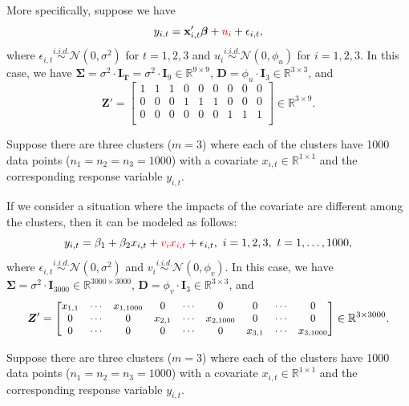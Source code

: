 \documentclass[ignorenonframetext,]{beamer}
\begin{document}
\begin{frame}[allowframebreaks]
\framebreak


More specifically, suppose we have
$$
y_{i,t} = \mathbf{x}_{i,t}'\bm{\beta} + {\color{red}u_i}+ \epsilon_{i,t},
$$
where $\epsilon_{i,t} \overset{i.i.d.}\sim \mathcal{N}(0, \sigma^2)$  for $t=1,2, 3$ and $u_i \overset{i.i.d.}\sim \mathcal{N}(0, \phi_u)$ for $i=1,2, 3$. In this case, we have $\bm{\Sigma} = \sigma^2 \cdot \bm{I}_{\bm{T}} = \sigma^2 \cdot \bm{I}_{9} \in \mathbb{R}^{9 \times 9}$, $\bm{D}= \phi_u \cdot \bm{I}_{{3}}\in \mathbb{R}^{{3} \times {3}}$, and
$$
\bm{Z}'=\begin{bmatrix}
1 & 1 & 1 & 0 & 0 & 0 & 0 & 0 & 0 \\
0 & 0 & 0 & 1 & 1 & 1 & 0 & 0 & 0 \\
0 & 0 & 0 & 0 & 0 & 0 & 1 & 1 & 1 \\
\end{bmatrix}\in \mathbb{R}^{3 \times 9}.
$$

\framebreak

\small
\begin{exam}
Suppose there are three clusters ($m=3$) where each of the clusters have 1000 data points ($n_1=n_2=n_3=1000$) with a covariate ${x}_{i,t} \in \mathbb{R}^{1 \times 1}$  and the corresponding response variable $y_{i,t}$. 

If we consider a situation where the {\color{red} impacts of the covariate are different among the clusters}, then it can be modeled as follows:
$$
y_{i,t} = \beta_1 + \beta_2 {x}_{i,t} + {\color{red}v_i {x}_{i,t}}+ \epsilon_{i,t}, \ i=1,2,3, \ t=1,\ldots, 1000,
$$
where $\epsilon_{i,t} \overset{i.i.d.}\sim \mathcal{N}(0, \sigma^2)$  and $v_i \overset{i.i.d.}\sim \mathcal{N}(0, \phi_v)$. In this case, we have $\bm{\Sigma} =  \sigma^2 \cdot \bm{I}_{3000} \in \mathbb{R}^{3000 \times 3000}$, 
$\bm{D}= \phi_v \cdot \bm{I}_3 \in \mathbb{R}^{{3} \times {3}}$, and %
$$
{\small
\bm{Z}'=\begin{bmatrix}
 {x}_{1,1} & \cdots &  {x}_{1,1000} & 0 & \cdots & 0 & 0 & \cdots & 0 \\
0 & \cdots & 0 & {x}_{2,1} & \cdots &  {x}_{2,1000} & 0 & \cdots & 0 \\
0 & \cdots & 0 & 0 & \cdots & 0 & {x}_{3,1} & \cdots &  {x}_{3,1000}\\
\end{bmatrix}\in \mathbb{R}^{3 \times 3000}. }
$$
\end{exam}

\framebreak

\begin{exam}
Suppose there are three clusters ($m=3$) where each of the clusters have 1000 data points ($n_1=n_2=n_3=1000$) with a covariate ${x}_{i,t} \in \mathbb{R}^{1 \times 1}$  and the corresponding response variable $y_{i,t}$. 


\end{exam}
\end{frame}
\end{document}
